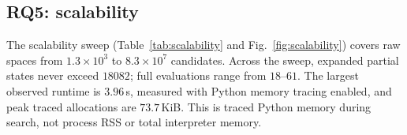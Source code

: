 \documentclass[preprint,11pt,3p]{elsarticle}
\theoremstyle{plain}
\theoremstyle{definition}
\begin{document}
\subsection{RQ5: scalability}
\providecommand{\RefFunnelSite}{Table~\ref{tab:funnel} and Fig.~\ref{fig:funnel}}
\providecommand{\RefFunnelTab}{Table~\ref{tab:funnel}}
\providecommand{\RefBaselinesTab}{Table~\ref{tab:baselines}}
\providecommand{\RefStatsTab}{Table~\ref{tab:stats}}
\providecommand{\RefHvFig}{Figure~\ref{fig:hv_budget}}
\providecommand{\RefCrossoverFig}{Fig.~\ref{fig:crossover}}
\providecommand{\RefAblationSite}{Table~\ref{tab:ablation} and Fig.~\ref{fig:ablation}}
\providecommand{\RefScalSite}{Table~\ref{tab:scalability} and Fig.~\ref{fig:scalability}}
\providecommand{\RefOrderTab}{Table~\ref{tab:order}}
\providecommand{\RefSolverTab}{Table~\ref{tab:solver}}
\providecommand{\RefDesTab}{Table~\ref{tab:des}}
\providecommand{\RefTestbedTab}{Table~\ref{tab:testbed}}
\providecommand{\RefReliabilityFig}{Fig.~\ref{fig:model_vs_measured}b}%
The scalability sweep (\RefScalSite{}) covers raw spaces from $1.3\times10^3$ to $8.3\times10^7$ candidates. Across the sweep, expanded partial states never exceed $18082$; full evaluations range from $18\text{--}61$. The largest observed runtime is $3.96$\,s, measured with Python memory tracing enabled, and peak traced allocations are $73.7$\,KiB. This is traced Python memory during search, not process RSS or total interpreter memory.
\end{document}
